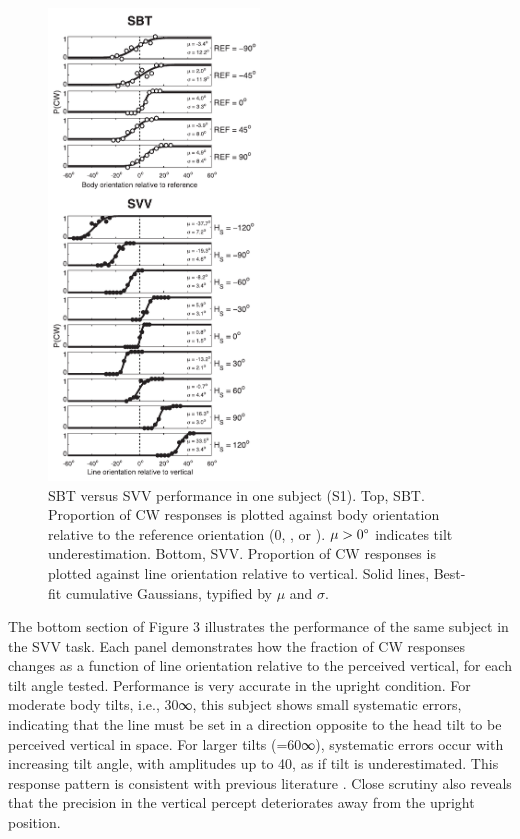 \begin{figure}
    \includegraphics[width=0.5\textwidth]{src/paper1/figure3.pdf}
    
    \caption{SBT versus SVV performance in one subject (S1). Top, SBT. Proportion of CW responses is plotted against body orientation relative to the reference orientation (0\textdegree, \textdegree, or \textdegree). $\mu > 0\degree$ indicates tilt underestimation. Bottom, SVV. Proportion of CW responses is plotted against line orientation relative to vertical. Solid lines, Best-fit cumulative Gaussians, typified by $\mu$ and $\sigma$.}  
    \label{p1:fig3}
\end{figure}

The bottom section of Figure 3 illustrates the performance of the same subject in the SVV task. Each panel demonstrates how the fraction of CW responses changes as a function of line orientation relative to the perceived vertical, for each tilt angle tested. Performance is very accurate in the upright condition. For moderate body tilts, i.e., 30∞, this subject shows small systematic errors, indicating that the line must be set in a direction opposite to the head tilt to be perceived vertical in space. For larger tilts (=60∞), systematic errors occur with increasing tilt angle, with amplitudes up to 40\textdegree, as if tilt is underestimated. This response pattern is consistent with previous literature \cite{aubert1861, udodehaes1970, mittelstaedt1983, vanbeuzekom2000}. Close scrutiny also reveals that the precision in the vertical percept deteriorates away from the upright position. 

